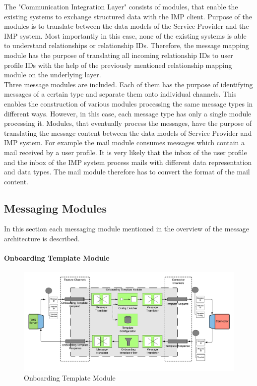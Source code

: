 The "Communication Integration Layer" consists of modules, that enable the existing systems to exchange structured data with the IMP client. Purpose of the modules is to translate between the data models of the Service Provider and the IMP system. Most importantly in this case, none of the existing systems is able to understand relationships or relationship IDs. Therefore, the message mapping module has the purpose of translating all incoming relationship IDs to user profile IDs with the help of the previously mentioned relationship mapping module on the underlying layer. \\
Three message modules are included. Each of them has the purpose of identifying messages of a certain type and separate them onto individual channels. This enables the construction of various modules processing the same message types in different ways. However, in this case, each message type has only a single module processing it. Modules, that eventually process the messages, have the purpose of translating the message content between the data models of Service Provider and IMP system. For example the mail module consumes messages which contain a mail received by a user profile. It is very likely that the inbox of the user profile and the inbox of the IMP system process mails with different data representation and data types. The mail module therefore has to convert the format of the mail content.

\subsection{Messaging Modules}

In this section each messaging module mentioned in the overview of the message architecture is described.

\paragraph{Onboarding Template Module}

\begin{figure}[h!]
    \centering
    \includegraphics[scale=0.6]{Diagrams/Integration Architecture 1/Technological Integration/6. Onboarding Template Module.pdf}
    \caption{Onboarding Template Module}
    \label{integration1:onboarding_template_module}
\end{figure}

